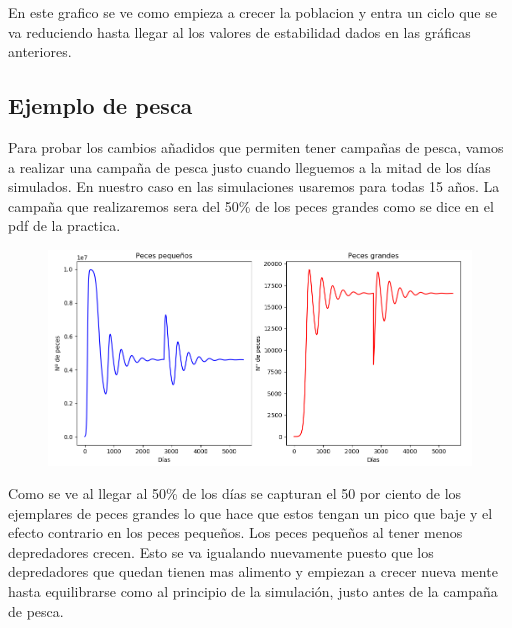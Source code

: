 \documentclass[]{article}
\begin{document}
En este grafico se ve como empieza a crecer la poblacion y entra un ciclo que se va reduciendo hasta llegar al los valores de estabilidad dados en las gráficas anteriores.
\subsection{Ejemplo de pesca}
Para probar los cambios añadidos que permiten tener campañas de pesca, vamos a realizar una campaña de pesca justo cuando lleguemos a la mitad de los días simulados. En nuestro caso en las simulaciones usaremos para todas 15 años. La campaña que realizaremos sera del 50\% de los peces grandes como se dice en el pdf de la practica.

\begin{figure}[H]
	\centering
	\includegraphics[width=1\linewidth]{img/screenshot0030}
	\caption{}
	\label{fig:screenshot0030}
\end{figure}
Como se ve al llegar al 50\% de los días se capturan el 50 por ciento de los ejemplares de peces grandes lo que hace que estos tengan un pico que baje y el efecto contrario en los peces pequeños. Los peces pequeños al tener menos depredadores crecen. Esto se va igualando nuevamente puesto que los depredadores que quedan tienen mas alimento y empiezan a crecer nueva mente hasta equilibrarse como al principio de la simulación, justo antes de la campaña de pesca. 
\end{document}
